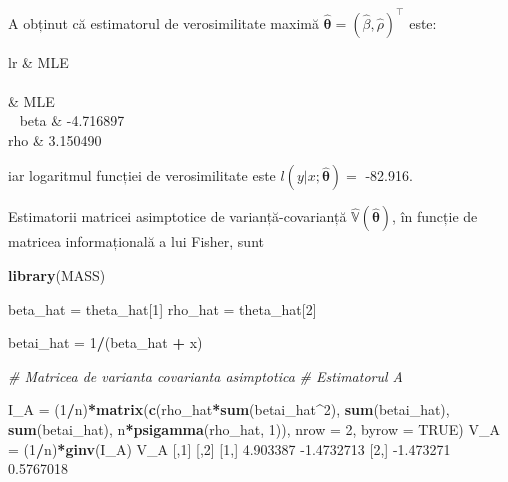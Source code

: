 \documentclass[]{article}
\newenvironment{Shaded}{\begin{snugshade}}{\end{snugshade}}
\newcommand{\CommentTok}[1]{\textcolor[rgb]{0.56,0.35,0.01}{\textit{#1}}}
\newcommand{\DataTypeTok}[1]{\textcolor[rgb]{0.13,0.29,0.53}{#1}}
\newcommand{\DecValTok}[1]{\textcolor[rgb]{0.00,0.00,0.81}{#1}}
\newcommand{\FloatTok}[1]{\textcolor[rgb]{0.00,0.00,0.81}{#1}}
\newcommand{\KeywordTok}[1]{\textcolor[rgb]{0.13,0.29,0.53}{\textbf{#1}}}
\newcommand{\NormalTok}[1]{#1}
\newcommand{\OperatorTok}[1]{\textcolor[rgb]{0.81,0.36,0.00}{\textbf{#1}}}
\newcommand{\OtherTok}[1]{\textcolor[rgb]{0.56,0.35,0.01}{#1}}
\newcommand{\StringTok}[1]{\textcolor[rgb]{0.31,0.60,0.02}{#1}}
\begin{document}
A obținut că estimatorul de verosimilitate maximă
\(\hat{\boldsymbol{\theta}} = (\hat{\beta}, \hat{\rho})^\intercal\)
este:

\begin{longtable}{lr}
\toprule
  & MLE\\
\midrule
\endfirsthead
{}\\
\toprule
  & MLE\\
\midrule
\endhead
\
\endfoot
\bottomrule
\endlastfoot
{}  beta & -4.716897\\
rho & 3.150490\\*
\end{longtable}

iar logaritmul funcției de verosimilitate este
\(l(y|x;\hat{\boldsymbol{\theta}}) =\) -82.916.

Estimatorii matricei asimptotice de varianță-covarianță
\(\hat{\mathbb{V}}(\hat{\boldsymbol{\theta}})\), în funcție de matricea
informațională a lui Fisher, sunt

\begin{Shaded}
\begin{Highlighting}[]
\KeywordTok{library}\NormalTok{(MASS)}

\NormalTok{beta_hat =}\StringTok{ }\NormalTok{theta_hat[}\DecValTok{1}\NormalTok{]}
\NormalTok{rho_hat =}\StringTok{ }\NormalTok{theta_hat[}\DecValTok{2}\NormalTok{]}

\NormalTok{betai_hat =}\StringTok{ }\DecValTok{1}\OperatorTok{/}\NormalTok{(beta_hat }\OperatorTok{+}\StringTok{ }\NormalTok{x)}

\CommentTok{# Matricea de varianta covarianta asimptotica }
\CommentTok{# Estimatorul A}

\NormalTok{I_A =}\StringTok{ }\NormalTok{(}\DecValTok{1}\OperatorTok{/}\NormalTok{n)}\OperatorTok{*}\KeywordTok{matrix}\NormalTok{(}\KeywordTok{c}\NormalTok{(rho_hat}\OperatorTok{*}\KeywordTok{sum}\NormalTok{(betai_hat}\OperatorTok{^}\DecValTok{2}\NormalTok{), }\KeywordTok{sum}\NormalTok{(betai_hat),}
                    \KeywordTok{sum}\NormalTok{(betai_hat), n}\OperatorTok{*}\KeywordTok{psigamma}\NormalTok{(rho_hat, }\DecValTok{1}\NormalTok{)), }
                  \DataTypeTok{nrow =} \DecValTok{2}\NormalTok{, }
                  \DataTypeTok{byrow =} \OtherTok{TRUE}\NormalTok{)}
\NormalTok{V_A =}\StringTok{ }\NormalTok{(}\DecValTok{1}\OperatorTok{/}\NormalTok{n)}\OperatorTok{*}\KeywordTok{ginv}\NormalTok{(I_A)}
\NormalTok{V_A}
\NormalTok{          [,}\DecValTok{1}\NormalTok{]       [,}\DecValTok{2}\NormalTok{]}
\NormalTok{[}\DecValTok{1}\NormalTok{,]  }\FloatTok{4.903387} \FloatTok{-1.4732713}
\NormalTok{[}\DecValTok{2}\NormalTok{,] }\FloatTok{-1.473271}  \FloatTok{0.5767018}
\end{Highlighting}
\end{Shaded}
\end{document}
